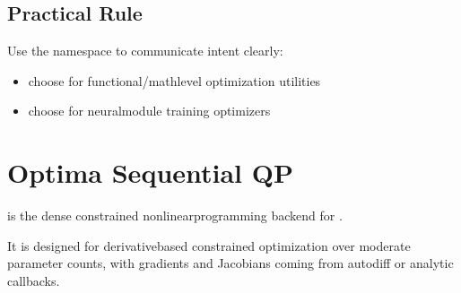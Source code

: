 \documentclass[letterpaper,10pt,english]{sphinxmanual}
\begin{document}
\section{Practical Rule}
\label{\detokenize{optimizer_surfaces:practical-rule}}
\sphinxAtStartPar
Use the namespace to communicate intent clearly:
\begin{itemize}
\item {} 
\sphinxAtStartPar
choose  for functional/math\sphinxhyphen{}level optimization utilities

\item {} 
\sphinxAtStartPar
choose  for neural\sphinxhyphen{}module training optimizers

\end{itemize}

\sphinxstepscope


\chapter{Optima Sequential QP}
\label{\detokenize{optima_sequential_qp:optima-sequential-qp}}\label{\detokenize{optima_sequential_qp::doc}}
\sphinxAtStartPar
{} is the dense constrained nonlinear\sphinxhyphen{}programming backend for .

\sphinxAtStartPar
It is designed for derivative\sphinxhyphen{}based constrained optimization over moderate parameter counts, with gradients and Jacobians coming from  autodiff or analytic callbacks.
\end{document}
